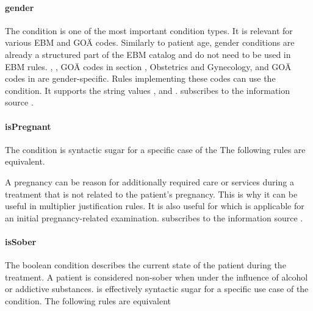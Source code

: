 \paragraph{gender}
The  condition is one of the most important condition types.
It is relevant for various EBM and GOÄ codes.
Similarly to patient age, gender conditions are already a structured part of the EBM catalog and do not need to be used in EBM rules.
, ,  GOÄ codes in section , Obstetrics and Gynecology, and GOÄ codes in  are gender-specific.
Rules implementing these codes can use the  condition.
It supports the string values ,  and .
 subscribes to the information source .


\paragraph{isPregnant}
The  condition is syntactic sugar for a specific case of the 
The following rules are equivalent.



A pregnancy can be reason for additionally required care or services during a treatment that is not related to the patient's pregnancy.
This is why it can be useful in multiplier justification rules.
It is also useful for  which is applicable for an initial pregnancy-related examination.
 subscribes to the information source .

\paragraph{isSober}
The  boolean condition describes the current state of the patient during the treatment.
A patient is considered non-sober when under the influence of alcohol or addictive substances.
 is effectively syntactic sugar for a specific use case of the  condition.
The following rules are equivalent




